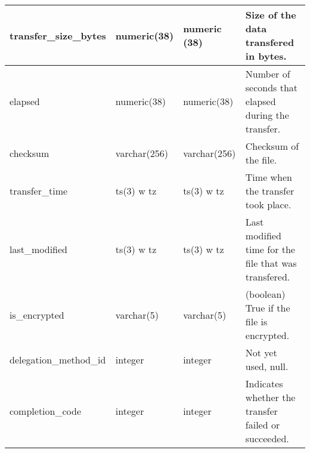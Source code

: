 \begin{center}
\begin{tabular}{|l|l|l|p{2.4in}|}
    transfer\_size\_bytes & numeric(38) & numeric (38) & Size of the data transfered in bytes.\\ \hline
    elapsed & numeric(38) & numeric(38) & Number of seconds that elapsed during the transfer.\\ \hline
    checksum & varchar(256) & varchar(256) & Checksum of the file.\\ \hline
    transfer\_time & ts(3) w tz & ts(3) w tz & Time when the transfer took place.\\ \hline
    last\_modified & ts(3) w tz & ts(3) w tz & Last modified time for the file that was transfered.\\ \hline
    is\_encrypted & varchar(5) & varchar(5) & (boolean) True if the file is encrypted.\\ \hline
    delegation\_method\_id & integer & integer & Not yet used, null.\\ \hline
    completion\_code & integer & integer & Indicates whether the transfer failed or succeeded.\\ \hline
  \end{tabular}
\vspace{24pt}
\end{center}


